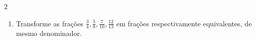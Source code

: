 \documentclass[a4paper,14pt]{article}
\begin{document}
\begin{multicols}{2}
\begin{enumerate}
\begin{enumerate}[a)]
				\item $\frac{328}{738}$ \\\\\\\\\\\\\\\\\\\\
				\item $\frac{964}{1687}$ \\\\\\\\\\\\\\\\\\\\
				\item -$\frac{2960}{2220}$ \newpage
			\end{enumerate}
			\item Transforme as frações $\frac{3}{4}, \frac{5}{8}, \frac{7}{10}, \frac{12}{13}$ em frações respectivamente equivalentes, de mesmo denominador.  \\\\\\\\\\\\\\\\\\\\\\\\\\\\\\\\\\\\\\\\\\\\\\\\\\\\\\\\\\\\\\\\\\\\\\\\

\end{enumerate}
\end{multicols}
\end{document}
